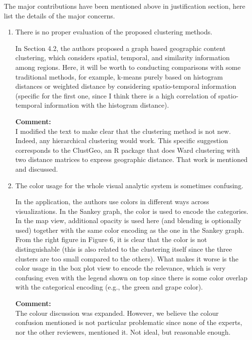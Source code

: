 \documentclass{article}
\newcommand{\reply}[1]{\begin{tcolorbox}\noindent\textbf{Comment:}\\#1\hfill\end{tcolorbox}}
\begin{document}
\begin{itemize}
{    The major contributions have been mentioned above in justification section, here
    list the details of the major concerns.
    \begin{enumerate}

    \item{There is no proper evaluation of the proposed clustering methods. 

    In Section 4.2, the authors proposed a graph based geographic content clustering,
    which considers spatial, temporal, and similarity information among regions. Here,
    it will be worth to conducting comparisons with some traditional methods, for
    example, k-means purely based on histogram distances or weighted distance by
    considering spatio-temporal information (specific for the first one, since I think
    there is a high correlation of spatio-temporal information with the histogram
    distance).

    \reply{I modified the text to make clear that the clustering method is not
    new. Indeed, any hierarchical clustering would work. This specific
    suggestion corresponds to the ClustGeo, an R package that does Ward
    clustering with two distance matrices to express geographic distance. That
    work is mentioned and discussed.}}


    \item{The color usage for the whole visual analytic system is sometimes confusing. 

    In the application, the authors use colors in different ways across
    visualizations. In the Sankey graph, the color is used to encode the categories.
    In the map view, additional opacity is used here (and blending is optionally used)
    together with the same color encoding as the one in the Sankey graph. From the
    right figure in Figure 6, it is clear that the color is not distinguishable (this
    is also related to the clustering itself since the three clusters are too small
    compared to the others). What makes it worse is the color usage in the box plot
    view to encode the relevance, which is very confusing even with the legend shown
    on top since there is some color overlap with the categorical encoding (e.g., the
    green and grape color).

    \reply{The colour discussion was expanded. However, we believe the colour
    confusion mentioned is not particular problematic since none of the experts,
    nor the other reviewers, mentioned it. Not ideal, but reasonable enough.}}


\end{enumerate}}
\end{itemize}
\end{document}
